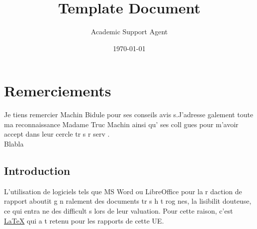 \documentclass{article}
\title{Template Document}
\author{Academic Support Agent}
\date{\today}
\begin{document}
\maketitle

\maketitle


\chapter*{Remerciements}
\thispagestyle{empty}
Je tiens   remercier Machin Bidule  pour ses conseils avis s.J'adresse  galement toute ma reconnaissance   Madame Truc Machin ainsi qu'  ses coll gues pour m'avoir accept  dans leur cercle tr s r serv . \\

Blabla

\MyToc


\newpage        %

\newpage        %
\sloppy          


\section{Introduction}

L'utilisation de logiciels tels que MS Word ou LibreOffice pour la r daction de rapport aboutit g n ralement   des documents tr s h t rog nes,   la lisibilit  douteuse, ce qui entra ne des difficult s lors de leur  valuation. Pour cette raison, c'est \href{http://fr.wikipedia.org/wiki/LaTeX}{\LaTeX} \cite{LaTeXProject2010, Wikipedia2011a} qui a  t  retenu pour les rapports de cette UE.
\end{document}
